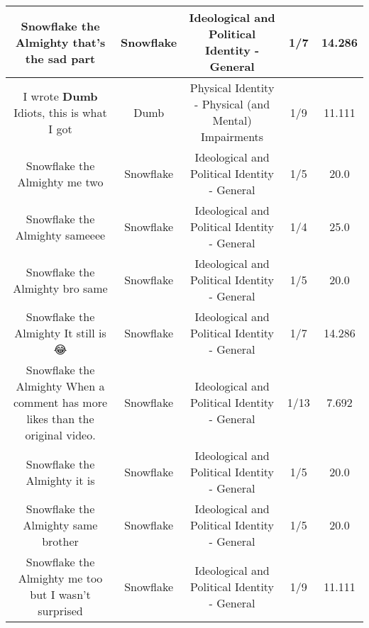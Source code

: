 \documentclass[11pt]{article}
\newlength\mylength
\begin{document}
\begin{center}
\begin{longtable}{|C{.65\mylength}|C{.30\mylength}|C{.12\mylength}|C{.12\mylength}|C{.12\mylength}|}
  \small Snowflake the Almighty that's the sad part\normalsize   & Snowflake &  Ideological and Political Identity - General & 1/7 & 14.286 \\  \hline
  \small I wrote \textbf{Dumb} Idiots, this is what I got\normalsize   & Dumb & Physical Identity - Physical (and Mental) Impairments & 1/9 & 11.111 \\  \hline
  \small Snowflake the Almighty me two\normalsize   & Snowflake &  Ideological and Political Identity - General & 1/5 & 20.0 \\  \hline
  \small Snowflake the Almighty  sameeee\normalsize   & Snowflake &  Ideological and Political Identity - General & 1/4 & 25.0 \\  \hline
  \small Snowflake the Almighty bro same\normalsize   & Snowflake &  Ideological and Political Identity - General & 1/5 & 20.0 \\  \hline
  \small Snowflake the Almighty It still is 😂\normalsize   & Snowflake &  Ideological and Political Identity - General & 1/7 & 14.286 \\  \hline
  \small Snowflake the Almighty When a comment has more likes than the original video.\normalsize   & Snowflake &  Ideological and Political Identity - General & 1/13 & 7.692 \\  \hline
  \small Snowflake the Almighty it is\normalsize   & Snowflake &  Ideological and Political Identity - General & 1/5 & 20.0 \\  \hline
  \small Snowflake the Almighty same brother\normalsize   & Snowflake &  Ideological and Political Identity - General & 1/5 & 20.0 \\  \hline
  \small Snowflake the Almighty me too but I wasn't surprised\normalsize   & Snowflake &  Ideological and Political Identity - General & 1/9 & 11.111 \\  \hline

\end{longtable}
\end{center}
\end{document}

